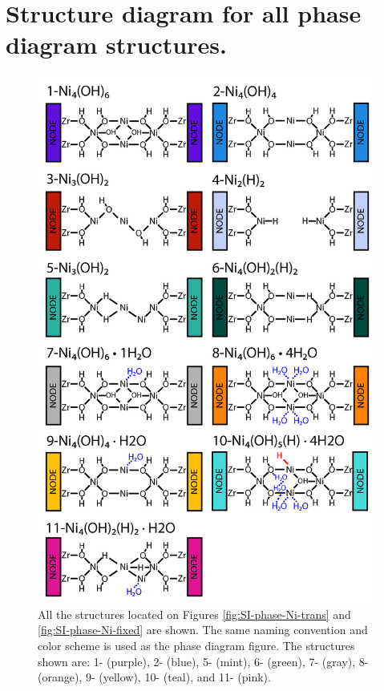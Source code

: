 \documentclass[12pt]{article}
\begin{document}
\newpage
\section{Structure diagram for all phase diagram structures.}
\begin{figure}[H]
    \centering
    \includegraphics{zi-images/04-SI-images/2021-05-11-updated-manuscript-structure-SI-ALL.png}
    \caption{
    All the structures located on Figures \ref{fig:SI-phase-Ni-trans} and \ref{fig:SI-phase-Ni-fixed} are shown. The same naming convention and color scheme is used as the phase diagram figure. The structures shown are: 
        1- (purple),               %
        2- (blue),                 %
        5- (mint),                  %
        6- (green),            %
        7- (gray),             %
        8- (orange),          %
        9- (yellow),           %
        10- (teal), and    %
        11- (pink).        %
    }
    \label{fig:SI-structure-diagram}
\end{figure}
\end{document}
